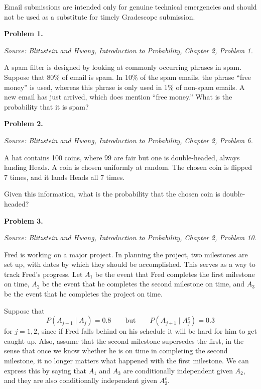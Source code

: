 \documentclass[11pt]{article}
\newcommand{\source}[1]{%
    \vspace{0.15cm}
    {\small\textit{Source: Blitzstein and Hwang, \textit{Introduction to Probability}, Chapter 2, Problem #1.}}
}
\begin{document}
Email submissions are intended only for genuine technical emergencies and should not be used as a substitute for timely Gradescope submission.

\newpage


\begin{problemheader}
\textbf{Problem 1.}
\end{problemheader}
\source{1}

A spam filter is designed by looking at commonly occurring phrases in spam. Suppose that $80\%$ of email is spam. In $10\%$ of the spam emails, the phrase ``free money'' is used, whereas this phrase is only used in $1\%$ of non-spam emails. A new email has just arrived, which does mention ``free money.'' What is the probability that it is spam?

\vfill

\newpage


\begin{problemheader}
\textbf{Problem 2.}
\end{problemheader}
\source{6}

A hat contains 100 coins, where 99 are fair but one is double-headed, always landing Heads. A coin is chosen uniformly at random. The chosen coin is flipped 7 times, and it lands Heads all 7 times.

Given this information, what is the probability that the chosen coin is double-headed?

\vfill

\newpage


\begin{problemheader}
\textbf{Problem 3. }
\end{problemheader}
\source{10}

Fred is working on a major project. In planning the project, two milestones are set up, with dates by which they should be accomplished. This serves as a way to track Fred's progress. Let $A_1$ be the event that Fred completes the first milestone on time, $A_2$ be the event that he completes the second milestone on time, and $A_3$ be the event that he completes the project on time.

Suppose that
\[
P(A_{j+1}\mid A_j)=0.8
\qquad\text{but}\qquad
P(A_{j+1}\mid A_j^c)=0.3
\]
for $j=1,2$, since if Fred falls behind on his schedule it will be hard for him to get caught up. Also, assume that the second milestone supersedes the first, in the sense that once we know whether he is on time in completing the second milestone, it no longer matters what happened with the first milestone. We can express this by saying that $A_1$ and $A_3$ are conditionally independent given $A_2$, and they are also conditionally independent given $A_2^c$.
\end{document}
